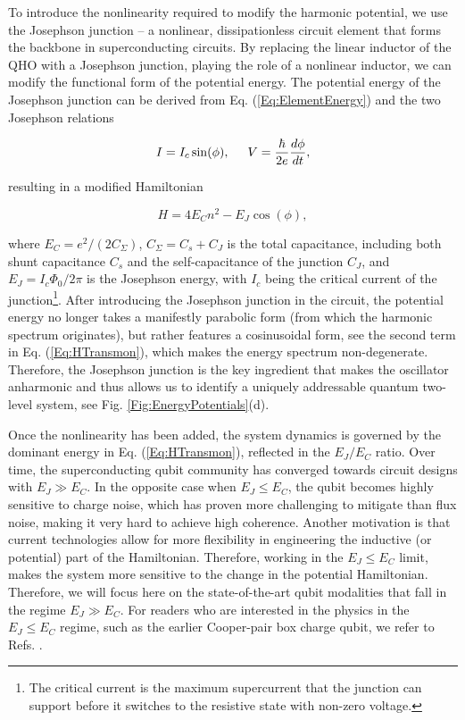 \documentclass[aip,apr,twocolumn,showpacs,superscriptaddress,groupedaddress,nofootinbib,reprint]{revtex4-1}  %
\begin{document}
To introduce the nonlinearity required to modify the harmonic potential, we use the Josephson junction -- a nonlinear, dissipationless circuit element that forms the backbone in superconducting circuits\cite{Josephson1962,Josephson1964}. By replacing the linear inductor of the QHO with a Josephson junction, playing the role of a nonlinear inductor, we can modify the functional form of the potential energy. The potential energy of the Josephson junction can be derived from Eq. (\ref{Eq:ElementEnergy}) and the two Josephson relations

\begin{equation}
I = I_c \sin (\phi), \hspace{0.5cm}V = \frac{\hbar}{2e} \frac{d\phi}{dt},
\label{Eq:JosephsonRelations}
\end{equation}

\noindent resulting in a modified Hamiltonian

\begin{equation}
H = 4E_C n^2 - E_J \cos(\phi),
\label{Eq:HTransmon}
\end{equation}

\noindent where $E_C = e^2/(2C_{\Sigma})$, $C_{\Sigma} = C_s + C_J$ is the total capacitance, including both shunt capacitance $C_s$ and the self-capacitance of the junction $C_J$, and $E_J = I_c \Phi_0/2\pi$ is the Josephson energy, with $I_c$ being the critical current of the junction\footnote{The critical current is the maximum supercurrent that the junction can support before it switches to the resistive state with non-zero voltage.}. After introducing the Josephson junction in the circuit, the potential energy no longer takes a manifestly parabolic form (from which the harmonic spectrum originates), but rather features a cosinusoidal form, see the second term in Eq. (\ref{Eq:HTransmon}), which makes the energy spectrum non-degenerate. Therefore, the Josephson junction is the key ingredient that makes the oscillator anharmonic and thus allows us to identify a uniquely addressable quantum two-level system, see Fig. \ref{Fig:EnergyPotentials}(d).

Once the nonlinearity has been added, the system dynamics is governed by the dominant energy in Eq. (\ref{Eq:HTransmon}), reflected in the $E_J/E_C$ ratio. Over time, the superconducting qubit community has converged towards circuit designs with $E_J \gg E_C$. In the opposite case when $E_J \leq E_C$, the qubit becomes highly sensitive to charge noise, which has proven more challenging to mitigate than flux noise, making it very hard to achieve high coherence. Another motivation is that current technologies allow for more flexibility in engineering the inductive (or potential) part of the Hamiltonian. Therefore, working in the $E_J \leq E_C$ limit, makes the system more sensitive to the change in the potential Hamiltonian. Therefore, we will focus here on the state-of-the-art qubit modalities that fall in the regime $E_J \gg E_C$. For readers who are interested in the physics in the $E_J \leq E_C$ regime, such as the earlier Cooper-pair box charge qubit, we refer to Refs. .
\end{document}
